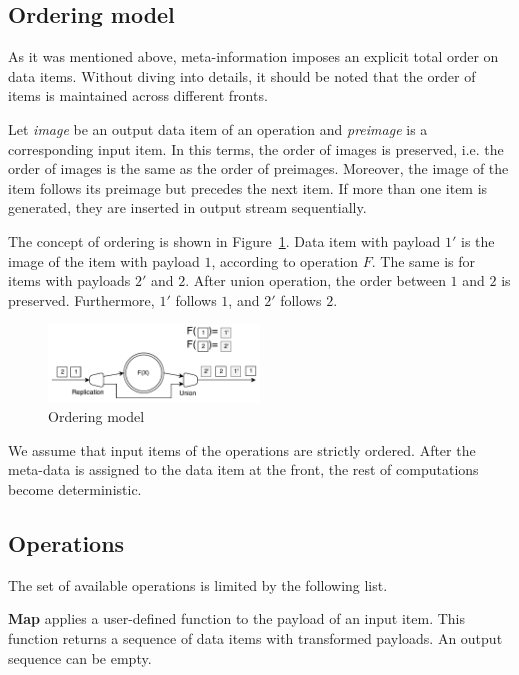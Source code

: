 \subsection{Ordering model}

As it was mentioned above, meta-information imposes an explicit total order on data items. Without diving into details, it should be noted that the order of items is maintained across different fronts.

Let {\it image} be an output data item of an operation and {\it preimage} is a corresponding input item. In this terms, the order of images is preserved, i.e. the order of images is the same as the order of preimages. Moreover, the image of the item follows its preimage but precedes the next item. If more than one item is generated, they are inserted in output stream sequentially. 

The concept of ordering is shown in Figure~\ref{ordering}. Data item with payload $1'$ is the image of the item with payload $1$, according to operation $F$. The same is for items with payloads $2'$ and $2$. After union operation, the order between $1$ and $2$ is preserved. Furthermore, $1'$ follows $1$, and $2'$ follows $2$.  

\begin{figure}[htbp]
  \centering
  \includegraphics[width=0.5\textwidth]{pics/ordering}
  \caption{Ordering model}
  \label {ordering}
\end{figure}

We assume that input items of the operations are strictly ordered. After the meta-data is assigned to the data item at the front, the rest of computations become deterministic.

\subsection{Operations}

The set of available operations is limited by the following list.

{\bf Map} applies a user-defined function to the payload of an input item. This function returns a sequence of data items with transformed payloads. An output sequence can be empty.

